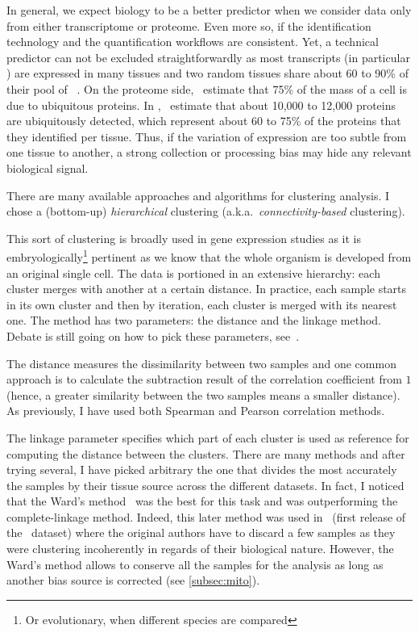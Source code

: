 In general, we expect biology to be a better predictor when we consider
data only from either transcriptome or proteome. Even more so, if the
identification technology and the quantification workflows are
consistent. Yet, a technical predictor can not be excluded straightforwardly
as most transcripts (in particular \mRNAs) are expressed in many tissues
and two random tissues share about 60 to 90\% of their pool of
\mRNAs~.
On the proteome side,~\cite{PandeyData}
estimate that 75\% of the mass of a cell is due to ubiquitous proteins.
In ,~\cite{KusterData} estimate that about 10,000
to 12,000 proteins are ubiquitously detected, which represent about 60 to 75\%
of the proteins that they identified per tissue. Thus, if the variation of
expression are too subtle from one tissue to another, a strong collection or
processing bias may hide any relevant biological signal.

There are many available approaches and algorithms for clustering analysis.
I chose a (bottom-up) \emph{hierarchical} clustering (a.k.a.\
\emph{connectivity-based} clustering).

This sort of clustering is broadly used in gene expression studies as it is
embryologically\footnote{Or evolutionary, when different species are compared}
pertinent as we know that the whole organism is developed from
an original single cell. The data is portioned in an extensive hierarchy:
each cluster merges with another at a certain distance.
In practice, each sample starts in its own cluster and then
by iteration, each cluster is merged with its nearest one.
The method has two parameters: the distance and the linkage method.
Debate is still going on how to pick these parameters, see~.

The distance measures the dissimilarity between two samples and one common
approach is to calculate the subtraction result of
the correlation coefficient from $1$ (hence, a greater similarity between the two
samples means a smaller distance). As previously, I have used both Spearman
and Pearson correlation methods.

The linkage parameter specifies which part of each cluster is used as reference
for computing the distance between the clusters. There are many methods and after
trying several, I have picked arbitrary the one that divides the most accurately
the samples by their tissue source across the different datasets.
In fact, I noticed that the Ward's method~\mycite{Ward1963}
was the best for this task and was outperforming the complete-linkage method.
Indeed, this later method was used in~\mycite{Uhlen2014}
(first release of the \uhlen\ dataset) where
the original authors have to discard a few samples as they were clustering
incoherently in regards of their biological nature.
However, the Ward's method allows to conserve all the samples for the analysis
as long as another bias source is corrected (see \cref{subsec:mito}).


